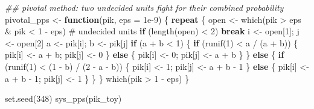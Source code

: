 \documentclass[
  letterpaper,
  DIV=11,
  numbers=noendperiod]{scrreprt}
\newenvironment{Shaded}{\begin{snugshade}}{\end{snugshade}}
\newcommand{\AttributeTok}[1]{\textcolor[rgb]{0.40,0.45,0.13}{#1}}
\newcommand{\CommentTok}[1]{\textcolor[rgb]{0.37,0.37,0.37}{#1}}
\newcommand{\ControlFlowTok}[1]{\textcolor[rgb]{0.00,0.23,0.31}{\textbf{#1}}}
\newcommand{\DecValTok}[1]{\textcolor[rgb]{0.68,0.00,0.00}{#1}}
\newcommand{\DocumentationTok}[1]{\textcolor[rgb]{0.37,0.37,0.37}{\textit{#1}}}
\newcommand{\FloatTok}[1]{\textcolor[rgb]{0.68,0.00,0.00}{#1}}
\newcommand{\FunctionTok}[1]{\textcolor[rgb]{0.28,0.35,0.67}{#1}}
\newcommand{\NormalTok}[1]{\textcolor[rgb]{0.00,0.23,0.31}{#1}}
\newcommand{\OtherTok}[1]{\textcolor[rgb]{0.00,0.23,0.31}{#1}}
\newcommand{\SpecialCharTok}[1]{\textcolor[rgb]{0.37,0.37,0.37}{#1}}
\renewcommand{\[}{\begin{equation}}
\renewcommand{\]}{\end{equation}}
\begin{document}
\begin{Shaded}
\begin{Highlighting}[]
\DocumentationTok{\#\# pivotal method: two undecided units fight for their combined probability}
\NormalTok{pivotal\_pps }\OtherTok{\textless{}{-}} \ControlFlowTok{function}\NormalTok{(pik, }\AttributeTok{eps =} \FloatTok{1e{-}9}\NormalTok{) \{}
  \ControlFlowTok{repeat}\NormalTok{ \{}
\NormalTok{    open }\OtherTok{\textless{}{-}} \FunctionTok{which}\NormalTok{(pik }\SpecialCharTok{\textgreater{}}\NormalTok{ eps }\SpecialCharTok{\&}\NormalTok{ pik }\SpecialCharTok{\textless{}} \DecValTok{1} \SpecialCharTok{{-}}\NormalTok{ eps)   }\CommentTok{\# undecided units}
    \ControlFlowTok{if}\NormalTok{ (}\FunctionTok{length}\NormalTok{(open) }\SpecialCharTok{\textless{}} \DecValTok{2}\NormalTok{) }\ControlFlowTok{break}
\NormalTok{    i }\OtherTok{\textless{}{-}}\NormalTok{ open[}\DecValTok{1}\NormalTok{]; j }\OtherTok{\textless{}{-}}\NormalTok{ open[}\DecValTok{2}\NormalTok{]}
\NormalTok{    a }\OtherTok{\textless{}{-}}\NormalTok{ pik[i]; b }\OtherTok{\textless{}{-}}\NormalTok{ pik[j]}
    \ControlFlowTok{if}\NormalTok{ (a }\SpecialCharTok{+}\NormalTok{ b }\SpecialCharTok{\textless{}} \DecValTok{1}\NormalTok{) \{}
      \ControlFlowTok{if}\NormalTok{ (}\FunctionTok{runif}\NormalTok{(}\DecValTok{1}\NormalTok{) }\SpecialCharTok{\textless{}}\NormalTok{ a }\SpecialCharTok{/}\NormalTok{ (a }\SpecialCharTok{+}\NormalTok{ b)) \{ pik[i] }\OtherTok{\textless{}{-}}\NormalTok{ a }\SpecialCharTok{+}\NormalTok{ b; pik[j] }\OtherTok{\textless{}{-}} \DecValTok{0}\NormalTok{ \}}
      \ControlFlowTok{else}\NormalTok{                        \{ pik[i] }\OtherTok{\textless{}{-}} \DecValTok{0}\NormalTok{;     pik[j] }\OtherTok{\textless{}{-}}\NormalTok{ a }\SpecialCharTok{+}\NormalTok{ b \}}
\NormalTok{    \} }\ControlFlowTok{else}\NormalTok{ \{}
      \ControlFlowTok{if}\NormalTok{ (}\FunctionTok{runif}\NormalTok{(}\DecValTok{1}\NormalTok{) }\SpecialCharTok{\textless{}}\NormalTok{ (}\DecValTok{1} \SpecialCharTok{{-}}\NormalTok{ b) }\SpecialCharTok{/}\NormalTok{ (}\DecValTok{2} \SpecialCharTok{{-}}\NormalTok{ a }\SpecialCharTok{{-}}\NormalTok{ b)) \{ pik[i] }\OtherTok{\textless{}{-}} \DecValTok{1}\NormalTok{;         pik[j] }\OtherTok{\textless{}{-}}\NormalTok{ a }\SpecialCharTok{+}\NormalTok{ b }\SpecialCharTok{{-}} \DecValTok{1}\NormalTok{ \}}
      \ControlFlowTok{else}\NormalTok{                                  \{ pik[i] }\OtherTok{\textless{}{-}}\NormalTok{ a }\SpecialCharTok{+}\NormalTok{ b }\SpecialCharTok{{-}} \DecValTok{1}\NormalTok{; pik[j] }\OtherTok{\textless{}{-}} \DecValTok{1}\NormalTok{ \}}
\NormalTok{    \}}
\NormalTok{  \}}
  \FunctionTok{which}\NormalTok{(pik }\SpecialCharTok{\textgreater{}} \DecValTok{1} \SpecialCharTok{{-}}\NormalTok{ eps)}
\NormalTok{\}}

\FunctionTok{set.seed}\NormalTok{(}\DecValTok{348}\NormalTok{)}
\FunctionTok{sys\_pps}\NormalTok{(pik\_toy)}
\end{Highlighting}
\end{Shaded}
\end{document}
